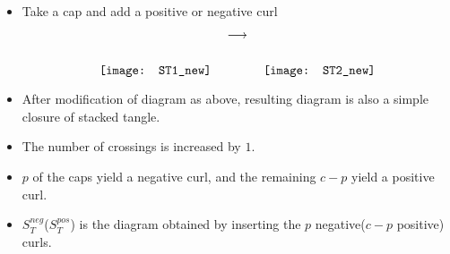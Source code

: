 \begin{frame}
	\begin{itemize}
		\item Take a cap and add a positive or negative curl
			$$\raisebox{-1cm}{\texttt{[image: ST1\_new]}} \quad \longrightarrow \quad \raisebox{-1cm}{\texttt{[image: ST2\_new]}}$$
		\item After modification of diagram as above, resulting diagram is also a simple closure of stacked tangle.
		\item The number of crossings is increased by $1$. 
		\item $p$ of the caps yield a negative curl, and the remaining $c-p$ yield a positive curl.
		\item $S_T^{neg}$($S_T^{pos}$) is the diagram obtained by inserting the $p$ negative($c-p$ positive) curls.
	\end{itemize}
\end{frame}



